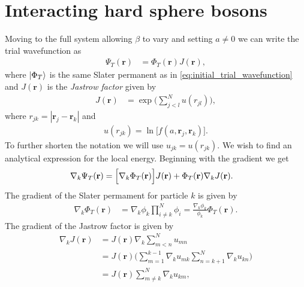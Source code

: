 \documentclass[
    a4paper, aps, twocolumn, floatfix, superscriptaddress, nofootinbib]{revtex4-1}
\newcommand{\vf}{\mathbf}
\newcommand{\1}{\mathds{1}}
\begin{document}
\section{Interacting hard sphere bosons}
    Moving to the full system allowing $\beta$ to vary and setting $a
    \neq 0$ we can write the trial wavefunction as
    \begin{align}
        \Psi_T(\vf{r})
        &=
        \Phi_T(\vf{r})
        J(\vf{r}),
    \end{align}
    where $\ket{\Phi_T}$ is the same Slater permanent as in
    \autoref{eq:initial_trial_wavefunction} and $J(\vf{r})$ is the
    \textit{Jastrow factor} given by
    \begin{align}
        J(\vf{r})
        &=
        \exp\Biggl(
            \sum_{j < l}^N u(r_{jl})
        \Biggr),
    \end{align}
    where $r_{jk} = |\vf{r}_j - \vf{r}_k|$ and
    \begin{align}
        u(r_{jk}) = \ln\bigl[f(a, \vf{r}_j, \vf{r}_k)\bigr].
    \end{align}
            To further shorten the notation we will use $u_{jk} = u(r_{jk})$.
            We wish to find an analytical expression for the local energy.
            Beginning with the gradient we get
            \begin{align}
                \nabla_k\Psi_T(\vf{r})
                &=
                \Bigl[
                    \nabla_k
                    \Phi_T(\vf{r})
                \Bigr]
                J(\vf{r})
                + \Phi_T(\vf{r})
                \nabla_k J(\vf{r}).
            \end{align}
            The gradient of the Slater permament for particle $k$ is given by
            \begin{align}
                \nabla_k
                \Phi_T(\vf{r})
                &=
                \nabla_k\phi_k
                \prod_{i \neq k}^N\phi_i
                = \frac{\nabla_k\phi_k}{\phi_k}
                \Phi_T(\vf{r}).
            \end{align}
            The gradient of the Jastrow factor is given by
            \begin{align}
                \nabla_k J(\vf{r})
                &=
                J(\vf{r})
                \nabla_k\sum_{m < n}^N u_{mn} \\
                &= J(\vf{r})
                \Biggl(
                    \sum_{m = 1}^{k - 1}\nabla_k u_{mk}
                    \sum_{n = k + 1}^N\nabla_k u_{kn}
                \Biggr)
                \\
                &=
                J(\vf{r})
                \sum_{m \neq k}^N\nabla_k u_{km},
            \end{align}
\end{document}
